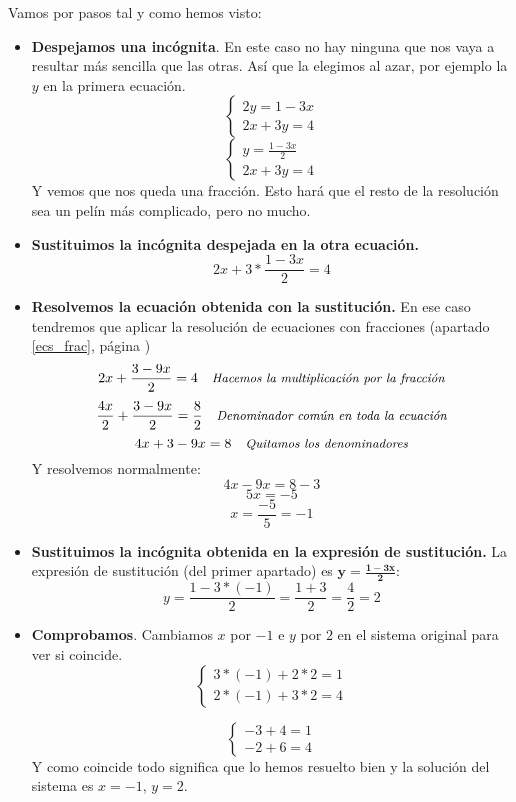 \documentclass[a4paper,11pt,answers]{exam}
\begin{document}
   \begin{solution}
     Vamos por pasos tal y como hemos visto:
     \begin{itemize}
     \item \textbf{Despejamos una incógnita}. En este caso no hay ninguna que nos vaya a resultar más sencilla que las otras. Así que la elegimos al azar, por ejemplo la $y$ en la primera ecuación.
       \[\begin{cases}
           2y = 1-3x\\
           2x +3y= 4
         \end{cases}
       \]
       \[\begin{cases}
           y = \frac{1-3x}{2}\\
           2x+3y = 4
         \end{cases}
       \]
       Y vemos que nos queda una fracción. Esto hará que el resto de la resolución sea un pelín más complicado, pero no mucho.
     \item \textbf{Sustituimos la incógnita despejada en la otra ecuación.}
       \[2x + 3*\frac{1-3x}{2} = 4\]
     \item \textbf{Resolvemos la ecuación obtenida con la sustitución.} En ese caso tendremos que aplicar la resolución de ecuaciones con fracciones (apartado \ref{ecs_frac}, página \pageref{ecs_frac})
       \[2x + \frac{3-9x}{2} = 4 \quad\text{\small{\textit{Hacemos la multiplicación por la fracción}}}\]
       \[\frac{4x}{2} + \frac{3-9x}{2} = \frac{8}{2}
         \quad \text{\small{\textit{Denominador común en toda la ecuación}}}
       \]
       \[
         4x + 3 - 9x = 8\quad\text{\small{\textit{Quitamos los denominadores}}}
       \]
       Y resolvemos normalmente:
       \[4x - 9x = 8 -3\]
       \[5x = -5\]
       \[x = \frac{-5}{5} = -1\]
     \item \textbf{Sustituimos la incógnita obtenida en la expresión de sustitución.} La expresión de sustitución (del primer apartado) es $\boldsymbol{y = \frac{1-3x}{2}}$:
       \[y = \frac{1-3*(-1)}{2} = \frac{1+3}{2} = \frac{4}{2} = 2\]
     \item \textbf{Comprobamos}. Cambiamos $x$ por $-1$ e $y$ por $2$ en el sistema original para ver si coincide.
       \[
         \begin{cases}
           3*(-1)+2*2 = 1\\
           2*(-1)+3*2 = 4
         \end{cases}
       \]

       \[
         \begin{cases}
           -3+4 = 1\\
           -2+6 = 4
         \end{cases}
       \]
       Y como coincide todo significa que lo hemos resuelto bien y la solución del sistema es $x=-1$, $y=2$.
     \end{itemize}
     
   \end{solution}
\end{document}
